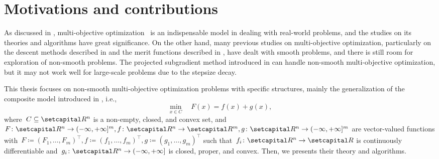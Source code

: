 \documentclass[../main]{subfiles}
\begin{document}
\section{Motivations and contributions} 
As discussed in , multi-objective optimization~ is an indispensable model in dealing with real-world problems, and the studies on its theories and algorithms have great significance.
On the other hand, many previous studies on multi-objective optimization, particularly on the descent methods described in  and the merit functions described in , have dealt with smooth problems, and there is still room for exploration of non-smooth problems.
The projected subgradient method introduced in  can handle non-smooth multi-objective optimization, but it may not work well for large-scale problems due to the stepsize decay.

This thesis focuses on non-smooth multi-objective optimization problems with specific structures, mainly the generalization of the composite model introduced in , i.e.,
\begin{equation} \label{eq:composite_MO}
    \min_{x \in C} \quad F(x) = f(x) + g(x)
,\end{equation} 
where~$C \subseteq \setR^n$ is a non-empty, closed, and convex set, and~$F \colon \setR^n \to (-\infty, +\infty]^m, f \colon \setR^n \to \setR^m, g \colon \setR^n \to (-\infty, +\infty]^m$ are vector-valued functions with~$F \coloneqq (F_1, \dots, F_m)^\top, f \coloneqq (f_1, \dots, f_m)^\top, g \coloneqq (g_1, \dots, g_m)^\top$ such that~$f_i \colon \setR^n \to \setR$ is continuously differentiable and~$g_i \colon \setR^n \to (-\infty, +\infty]$ is closed, proper, and convex.
Then, we presents their theory and algorithms.
\end{document}
